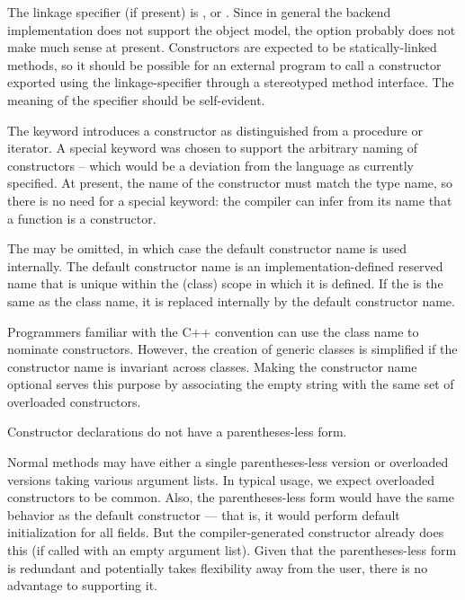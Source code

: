 The linkage specifier (if present) is ,  or .  Since
in general the backend implementation does not support the object model, the
 option probably does not make much sense at present.  Constructors are
expected to be statically-linked methods, so it should be possible for an external program
to call a constructor exported using the
 linkage-specifier through a stereotyped method interface.  The meaning of
the  specifier should be self-evident.

The keyword  introduces a constructor as distinguished from a procedure or
iterator.  A special keyword was chosen to support the arbitrary naming of constructors --
which would be a deviation from the language as currently specified.  At present, the name
of the constructor must match the type name, so there is no need for a special keyword:
the compiler can infer from its name that a function is a constructor.

The  may be omitted, in which case the default
constructor name is used internally.  The default constructor name is an
implementation-defined reserved name that is unique within the (class) scope in
which it is defined.  If the  is
the same as the class name, it is replaced internally by the default constructor name.
\begin{rationale}
Programmers familiar with the C++ convention can use the class name to nominate
constructors.  However, the creation of generic classes is simplified if the
constructor name is invariant across classes.  Making the constructor name
optional serves this purpose by associating the empty string with the same set
of overloaded constructors.
\end{rationale}

Constructor declarations do not have a parentheses-less form.
\begin{rationale}
Normal methods may have either a single parentheses-less version or overloaded
versions taking various argument lists.  In typical usage, we expect overloaded
constructors to be common.  Also, the parentheses-less form would have the same
behavior as the default constructor --- that is, it would perform default
initialization for all fields.  But the compiler-generated constructor already
does this (if called with an empty argument list).  Given that the
parentheses-less form is redundant and potentially takes flexibility away from
the user, there is no advantage to supporting it.
\end{rationale}

